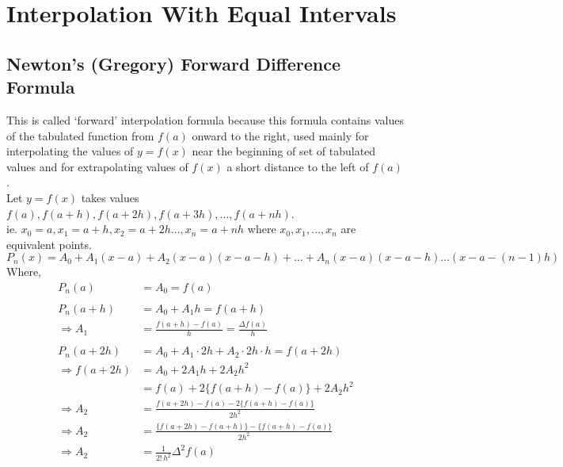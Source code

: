 \documentclass[12pt,class=book,crop=false]{standalone}
\begin{document}
\chapter{Interpolation With Equal Intervals}
\section{Newton's (Gregory) Forward Difference Formula}
This is called `forward' interpolation formula because this formula contains values of the tabulated function from \(  f(a) \) onward to the right, used mainly for interpolating the values of \(  y=f(x) \) near the beginning of set of tabulated values and for extrapolating values of \(  f(x) \) a short distance to the left of \(  f(a) \).\\

Let \(  y=f(x) \) takes values \(  f(a),f(a+h),f(a+2h),f(a+3h),\dots,f(a+nh) \).\\
ie. \(  x_0=a, x_1=a+h,x_2=a+2h\dots,x_n=a+nh\) where \(  x_0,x_1,\dots,x_n \) are equivalent points.
\[P_n(x)=A_0+A_1(x-a)+A_2(x-a)(x-a-h)+\dots+A_n(x-a)(x-a-h)\dots(x-a-(n-1)h)\]
Where,\\
\begin{align*}
    P_n(a)              & =A_0=f(a)                                        \\
                        &                                                  \\
    P_n(a+h)            & =A_0+A_1h=f(a+h)                                 \\
    \Rightarrow A_1     & =\frac{f(a+h)-f(a)}{h}=\frac{\Delta f(a)}{h}     \\
                        &                                                  \\
    P_n(a+2h)           & =A_0+A_1 \cdot 2h+A_2\cdot 2h\cdot h=f(a+2h)     \\
    \Rightarrow f(a+2h) & =A_0+2A_1 h+2A_2h^2                              \\
                        & =f(a)+2\{f(a+h)-f(a)\}+2A_2h^2                   \\
    \Rightarrow A_2     & =\frac{f(a+2h)-f(a)-2\{f(a+h)-f(a)\}}{2h^2}      \\
    \Rightarrow A_2     & =\frac{\{f(a+2h)-f(a+h)\}-\{f(a+h)-f(a)\}}{2h^2} \\
    \Rightarrow A_2     & =\frac{1}{2!\, h^2}\Delta^2f(a)                  \\
\end{align*}
\end{document}
